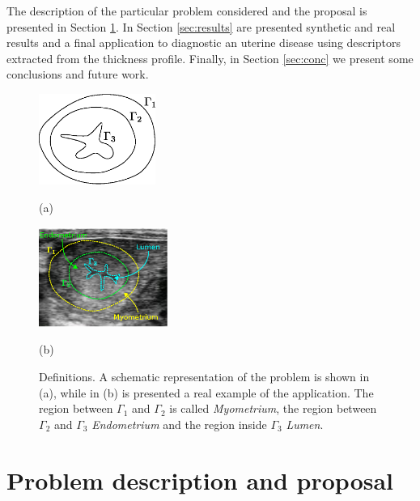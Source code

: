 \documentclass{article}
\begin{document}
The description of the particular problem considered and the proposal is presented in Section \ref{sec:proposal}. In Section \ref{sec:results} are presented synthetic and real results and a final application to diagnostic an uterine disease using descriptors extracted from the thickness profile. Finally, in Section \ref{sec:conc} we present some conclusions and future work.

\begin{figure}[t]
\begin{minipage}[b]{.45\linewidth}
  \centering
  \centerline{\includegraphics[width=3.8cm]{pics/defs2}}
  \centerline{(a)}\medskip
\end{minipage}\hfill
\begin{minipage}[b]{.52\linewidth}
  \centering
  \centerline{\includegraphics[width=4.2cm]{pics/defsEndo}}
  \centerline{(b)}\medskip
\end{minipage}
\caption{Definitions. A schematic representation of the problem is shown in (a), while in (b) is presented a real example of the application. The region between $\Gamma_1$ and $\Gamma_2$ is called \emph{Myometrium}, the region between $\Gamma_2$ and $\Gamma_3$ \emph{Endometrium} and the region inside $\Gamma_3$ \emph{Lumen}.}
\label{fig:defs}
\end{figure}

\section{Problem description and proposal}
\label{sec:proposal}
\end{document}
